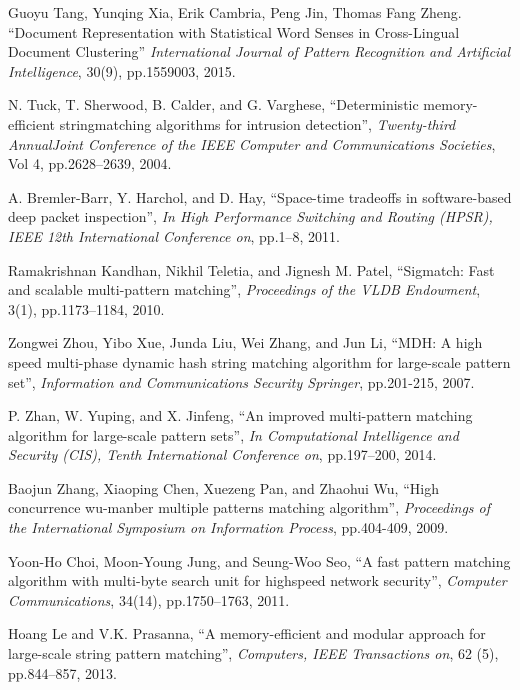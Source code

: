 \documentclass{ws-ijprai}
\begin{document}
\begin{thebibliography}{99}
 Guoyu Tang, Yunqing Xia, Erik Cambria, Peng Jin,
  Thomas Fang Zheng. ``Document Representation with Statistical Word
  Senses in Cross-Lingual Document Clustering'' {\it International
    Journal of Pattern Recognition and Artificial Intelligence},
  30(9), pp.1559003, 2015.

 N. Tuck, T. Sherwood, B. Calder, and G. Varghese,
  ``Deterministic memory-efficient stringmatching algorithms for
  intrusion detection'', {\it Twenty-third AnnualJoint Conference of
    the IEEE Computer and Communications Societies}, Vol 4,
  pp.2628–2639, 2004.

 A. Bremler-Barr, Y. Harchol, and D. Hay,
  ``Space-time tradeoffs in software-based deep packet inspection'',
  {\it In High Performance Switching and Routing (HPSR), IEEE 12th
    International Conference on}, pp.1–8, 2011.

 Ramakrishnan Kandhan, Nikhil Teletia, and
  Jignesh M. Patel, ``Sigmatch: Fast and scalable multi-pattern
  matching'', {\it Proceedings of the VLDB Endowment}, 3(1),
  pp.1173–1184, 2010.

 Zongwei Zhou, Yibo Xue, Junda Liu, Wei Zhang, and
  Jun Li, ``MDH: A high speed multi-phase dynamic hash string matching
  algorithm for large-scale pattern set'', {\it Information and
    Communications Security Springer}, pp.201-215, 2007.

 P. Zhan, W. Yuping, and X. Jinfeng, ``An improved
  multi-pattern matching algorithm for large-scale pattern sets'',
  {\it In Computational Intelligence and Security (CIS), Tenth
    International Conference on}, pp.197–200, 2014.

 Baojun Zhang, Xiaoping Chen, Xuezeng Pan, and
  Zhaohui Wu, ``High concurrence wu-manber multiple patterns matching
  algorithm'', {\it Proceedings of the International Symposium on
    Information Process}, pp.404-409, 2009.

 Yoon-Ho Choi, Moon-Young Jung, and Seung-Woo Seo,
  ``A fast pattern matching algorithm with multi-byte search unit for
  highspeed network security'', {\it Computer Communications}, 34(14),
  pp.1750–1763, 2011.

 Hoang Le and V.K. Prasanna, ``A memory-efficient and
  modular approach for large-scale string pattern matching'', {\it
    Computers, IEEE Transactions on}, 62 (5), pp.844–857, 2013.


\end{thebibliography}
\end{document}
